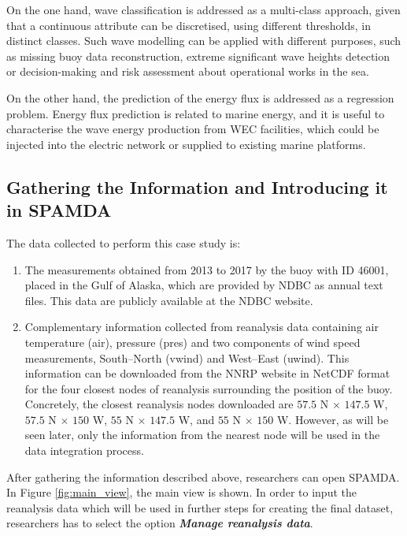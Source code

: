 \documentclass[energies,article,accept,moreauthors,pdftex]{Definitions/mdpi}
\begin{document}
\begin{paracol}{2}
		On the one hand, wave classification is addressed as a multi-class approach, given that a continuous attribute can be discretised, using different thresholds, in distinct classes. Such wave modelling can be applied with different purposes, such as missing buoy data reconstruction, extreme significant wave heights detection or decision-making and risk assessment about operational works in the sea.

		On the other hand, the prediction of the energy flux is addressed as a regression problem. Energy flux prediction is related to marine energy, and it is useful to characterise the wave energy production from WEC facilities, which could be injected into the electric network or supplied to existing marine platforms.

		\subsection{Gathering the Information and Introducing it in SPAMDA}\label{sec:ObtainingFinalDataset}
		
			The data collected to perform this case study is:
			\begin{enumerate}
			\item The measurements obtained from 2013 to 2017 by the buoy with ID 46001, placed in the Gulf of Alaska, which are provided by NDBC as annual text files. This data are publicly available at the NDBC website. 
			\item Complementary information collected from reanalysis data containing air temperature (air), pressure (pres) and two components of wind speed measurements, South--North (vwind) and West--East (uwind). This information can be downloaded from the NNRP website in NetCDF format for the four closest nodes of reanalysis surrounding the position of the buoy. Concretely, the closest reanalysis nodes downloaded are $57.5$ N $\times$ $147.5$ W, $57.5$ N $\times$ $150$ W, $55$ N $\times$ $147.5$ W, and $55$ N $\times$ $150$ W. However, as will be seen later, only the information from the nearest node will be used in the data integration process.
			\end{enumerate}
		
			After gathering the information described above, researchers can open SPAMDA. In Figure \ref{fig:main_view}, the main view is shown. In order to input the reanalysis data which will be used in further steps for creating the final dataset, researchers has to select the option \textbf{\textit{Manage reanalysis data}}.


\end{paracol}
\end{document}
